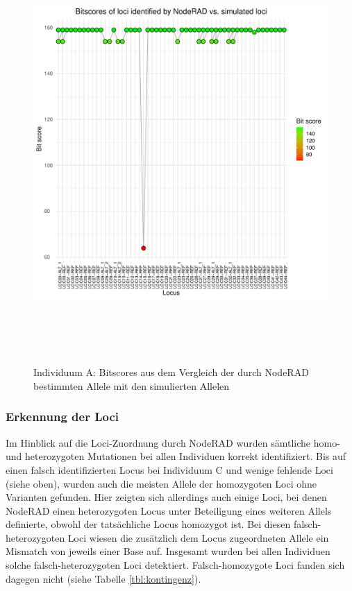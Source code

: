 \begin{figure}[H]
	\begin{center}
		\includegraphics[height=16cm]{bilder/evaluation/bitscores/A.plot_bitscores.pdf}
		\caption{Individuum A: Bitscores aus dem Vergleich der durch NodeRAD bestimmten Allele mit den simulierten Allelen}
		\label{fig:a-bitscore}
	\end{center}
\end{figure}

\subsubsection{Erkennung der Loci} \label{subsubsec:res_loci}
Im Hinblick auf die Loci-Zuordnung durch NodeRAD wurden sämtliche homo- und heterozygoten Mutationen bei allen Individuen korrekt identifiziert. Bis auf einen falsch identifizierten Locus bei Individuum C und wenige fehlende Loci (siehe oben), wurden auch die meisten Allele der homozygoten Loci ohne Varianten gefunden. Hier zeigten sich allerdings auch einige Loci, bei denen NodeRAD einen heterozygoten Locus unter Beteiligung eines weiteren Allels definierte, obwohl der tatsächliche Locus homozygot ist. Bei diesen falsch-heterozygoten Loci wiesen die zusätzlich dem Locus zugeordneten Allele ein Mismatch von jeweils einer Base auf. Insgesamt wurden bei allen Individuen solche falsch-heterozygoten Loci detektiert. Falsch-homozygote Loci fanden sich dagegen nicht (siehe Tabelle \ref{tbl:kontingenz}).

